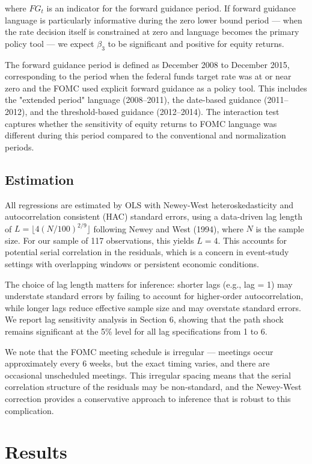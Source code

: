 where $FG_t$ is an indicator for the forward guidance period. If forward guidance language is particularly informative during the zero lower bound period --- when the rate decision itself is constrained at zero and language becomes the primary policy tool --- we expect $\beta_3$ to be significant and positive for equity returns.

The forward guidance period is defined as December 2008 to December 2015, corresponding to the period when the federal funds target rate was at or near zero and the FOMC used explicit forward guidance as a policy tool. This includes the "extended period" language (2008--2011), the date-based guidance (2011--2012), and the threshold-based guidance (2012--2014). The interaction test captures whether the sensitivity of equity returns to FOMC language was different during this period compared to the conventional and normalization periods.

\subsection{Estimation}

All regressions are estimated by OLS with Newey-West heteroskedasticity and autocorrelation consistent (HAC) standard errors, using a data-driven lag length of $L = \lfloor 4(N/100)^{2/9} \rfloor$ following Newey and West (1994), where $N$ is the sample size. For our sample of 117 observations, this yields $L = 4$. This accounts for potential serial correlation in the residuals, which is a concern in event-study settings with overlapping windows or persistent economic conditions.

The choice of lag length matters for inference: shorter lags (e.g., lag = 1) may understate standard errors by failing to account for higher-order autocorrelation, while longer lags reduce effective sample size and may overstate standard errors. We report lag sensitivity analysis in Section 6, showing that the path shock remains significant at the 5\% level for all lag specifications from 1 to 6.

We note that the FOMC meeting schedule is irregular --- meetings occur approximately every 6 weeks, but the exact timing varies, and there are occasional unscheduled meetings. This irregular spacing means that the serial correlation structure of the residuals may be non-standard, and the Newey-West correction provides a conservative approach to inference that is robust to this complication.


\section{Results}


